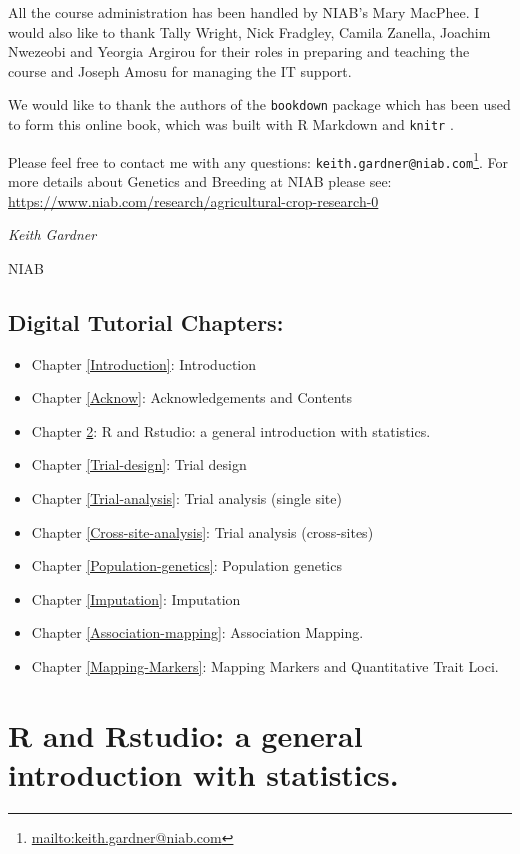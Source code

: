 \documentclass[
]{book}
\renewcommand{\href}[2]{#2\footnote{\url{#1}}}
\begin{document}
All the course administration has been handled by NIAB's Mary MacPhee. I would also like to thank Tally Wright, Nick Fradgley, Camila Zanella, Joachim Nwezeobi and Yeorgia Argirou for their roles in preparing and teaching the course and Joseph Amosu for managing the IT support.

We would like to thank the authors of the \texttt{bookdown} package \citep{R-bookdown} which has been used to form this online book, which was built with R Markdown and \texttt{knitr} \citep{xie2015}.

Please feel free to contact me with any questions: \href{mailto:keith.gardner@niab.com}{\nolinkurl{keith.gardner@niab.com}}. For more details about Genetics and Breeding at NIAB please see: \url{https://www.niab.com/research/agricultural-crop-research-0}

\emph{Keith Gardner}

NIAB

\hypertarget{digital-tutorial-chapters}{%
\section{Digital Tutorial Chapters:}\label{digital-tutorial-chapters}}

\begin{itemize}
\item
  Chapter \ref{Introduction}: Introduction
\item
  Chapter \ref{Acknow}: Acknowledgements and Contents
\item
  Chapter \ref{R-and-stats}: R and Rstudio: a general introduction with statistics.
\item
  Chapter \ref{Trial-design}: Trial design
\item
  Chapter \ref{Trial-analysis}: Trial analysis (single site)
\item
  Chapter \ref{Cross-site-analysis}: Trial analysis (cross-sites)
\item
  Chapter \ref{Population-genetics}: Population genetics
\item
  Chapter \ref{Imputation}: Imputation
\item
  Chapter \ref{Association-mapping}: Association Mapping.
\item
  Chapter \ref{Mapping-Markers}: Mapping Markers and Quantitative Trait Loci.
\end{itemize}

\hypertarget{R-and-stats}{%
\chapter{R and Rstudio: a general introduction with statistics.}\label{R-and-stats}}
\end{document}
